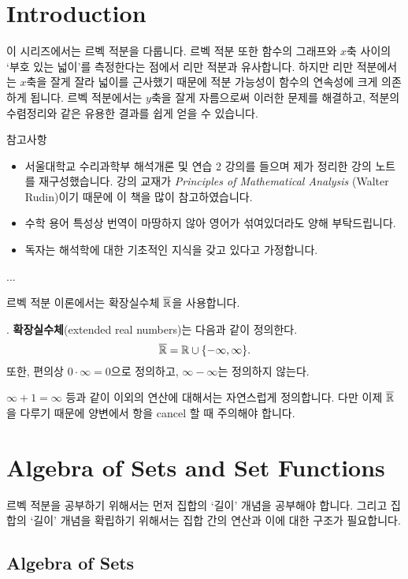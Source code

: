 \section*{Introduction}

이 시리즈에서는 르벡 적분을 다룹니다. 르벡 적분 또한 함수의 그래프와 \(x\)축 사이의 `부호 있는 넓이'를 측정한다는 점에서 리만 적분과 유사합니다. 하지만 리만 적분에서는 \(x\)축을 잘게 잘라 넓이를 근사했기 때문에 적분 가능성이 함수의 연속성에 크게 의존하게 됩니다. 르벡 적분에서는 \(y\)축을 잘게 자름으로써 이러한 문제를 해결하고, 적분의 수렴정리와 같은 유용한 결과를 쉽게 얻을 수 있습니다.

참고사항
\begin{itemize}
    \item 서울대학교 수리과학부 해석개론 및 연습 2 강의를 들으며 제가 정리한 강의 노트를 재구성했습니다. 강의 교재가 \textit{Principles of Mathematical Analysis} (Walter Rudin)이기 때문에 이 책을 많이 참고하였습니다.
    \item 수학 용어 특성상 번역이 마땅하지 않아 영어가 섞여있더라도 양해 부탁드립니다.
    \item 독자는 해석학에 대한 기초적인 지식을 갖고 있다고 가정합니다.
\end{itemize}

...

르벡 적분 이론에서는 확장실수체 \(\overline{\R}\)을 사용합니다.

. \note{\(\overline{\R}\)} \textbf{확장실수체}(extended real numbers)는 다음과 같이 정의한다.
\[
    \overline{\mathbb{R}} = \mathbb{R} \cup \{-\infty, \infty\}.
\]
또한, 편의상 \(0\cdot \infty = 0\)으로 정의하고, \(\infty - \infty\)는 정의하지 않는다.

\(\infty + 1 = \infty\) 등과 같이 이외의 연산에 대해서는 자연스럽게 정의합니다. 다만 이제 \(\overline{\R}\)을 다루기 때문에 양변에서 항을 cancel 할 때 주의해야 합니다.

\section*{Algebra of Sets and Set Functions}

르벡 적분을 공부하기 위해서는 먼저 집합의 `길이' 개념을 공부해야 합니다. 그리고 집합의 `길이' 개념을 확립하기 위해서는 집합 간의 연산과 이에 대한 구조가 필요합니다.

\subsection*{Algebra of Sets}

